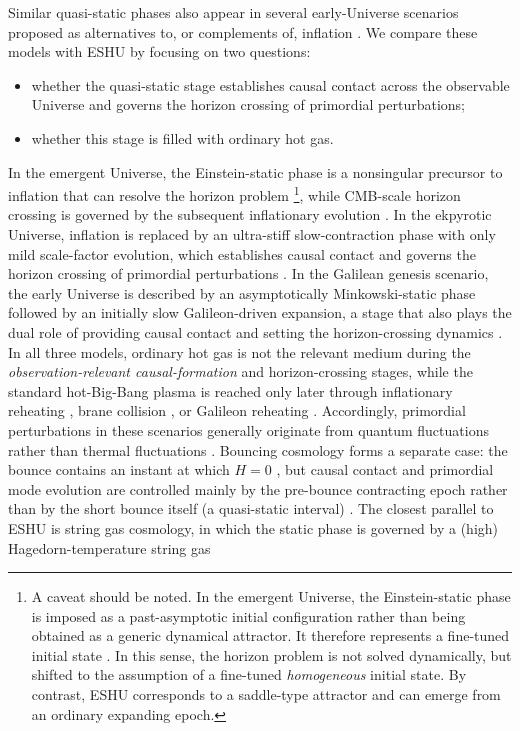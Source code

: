 \documentclass[aps,prd,twocolumn]{revtex4-2}
\begin{document}
Similar quasi-static phases also appear in several early-Universe scenarios proposed as alternatives to, or complements of, inflation \cite{Ellis2004.CQG.21.223,Khoury2001.PRD.64.123522,Creminelli2010.JCAP.11.021,Parker1973.PRD.7.2357,Tseytlin1992.NuclPhysB.372.443}. We compare these models with ESHU by focusing on two questions:
\begin{itemize}
  \item whether the quasi-static stage establishes causal contact across the observable Universe and governs the horizon crossing of primordial perturbations;
  \item whether this stage is filled with ordinary hot gas.
\end{itemize}
In the emergent Universe, the Einstein-static phase is a nonsingular precursor to inflation that can resolve the horizon problem \footnote{A caveat should be noted. In the emergent Universe, the Einstein-static phase is imposed as a past-asymptotic initial configuration rather than being obtained as a generic dynamical attractor. It therefore represents a fine-tuned initial state \cite{Ellis2004.CQG.21.223}. In this sense, the horizon problem is not solved dynamically, but shifted to the assumption of a fine-tuned \textit{homogeneous} initial state. By contrast, ESHU corresponds to a saddle-type attractor and can emerge from an ordinary expanding epoch.}, while CMB-scale horizon crossing is governed by the subsequent inflationary evolution \cite{Ellis2004.CQG.21.223,Ellis2004.CQG.21.233}. In the ekpyrotic Universe, inflation is replaced by an ultra-stiff slow-contraction phase with only mild scale-factor evolution, which establishes causal contact and governs the horizon crossing of primordial perturbations \cite{Khoury2001.PRD.64.123522,Lehners2008.PhysRep.465.223}. In the Galilean genesis scenario, the early Universe is described by an asymptotically Minkowski-static phase followed by an initially slow Galileon-driven expansion, a stage that also plays the dual role of providing causal contact and setting the horizon-crossing dynamics \cite{Creminelli2010.JCAP.11.021,Wang2012.JCAP.10.021}. In all three models, ordinary hot gas is not the relevant medium during the \textit{observation-relevant causal-formation} and horizon-crossing stages, while the standard hot-Big-Bang plasma is reached only later through inflationary reheating \cite{Ellis2004.CQG.21.223}, brane collision \cite{Khoury2001.PRD.64.123522}, or Galileon reheating \cite{Creminelli2010.JCAP.11.021}. Accordingly, primordial perturbations in these scenarios generally originate from quantum fluctuations rather than thermal fluctuations \cite{Ellis2004.CQG.21.233,Khoury2001.PRD.64.123522,Creminelli2010.JCAP.11.021,Wang2012.JCAP.10.021}. Bouncing cosmology forms a separate case: the bounce contains an instant at which $H=0$ \cite{Parker1973.PRD.7.2357}, but causal contact and primordial mode evolution are controlled mainly by the pre-bounce contracting epoch rather than by the short bounce itself (a quasi-static interval) \cite{Battefeld2015.PhysRep.571.1,Lilley2015.CRPhys.16.1038}. The closest parallel to ESHU is string gas cosmology, in which the static phase is governed by a (high) Hagedorn-temperature string gas 
\end{document}
